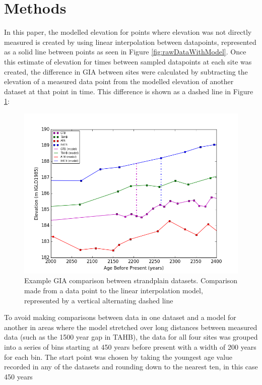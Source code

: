 \documentclass{article}
\begin{document}
 \section{Methods}
 In this paper, the modelled elevation for points where elevation was not directly
 measured is created by using linear interpolation between datapoints,
 represented as a solid line between points as seen in Figure \ref{fig:rawDataWithModel}.
 Once this estimate of elevation for times between sampled datapoints at each site
 was created, the difference in GIA between sites were calculated by subtracting
 the elevation of a measured data point from the modelled elevation of another
 dataset at that point in time. This difference is shown as a dashed line in
 Figure \ref{fig:rawDataWithModelZoomed}:
 \begin{figure}[h]
	\includegraphics[width=1.1\linewidth]{data/theDataZoomed.png}
	\caption{Example GIA comparison between strandplain datasets. Comparison made from a data point to the linear interpolation
	model, represented by a vertical alternating dashed line}
	\label{fig:rawDataWithModelZoomed}
 \end{figure}
 To avoid making comparisons between data in one dataset and a model for another
 in areas where the model stretched over long distances between measured data
 (such as the 1500 year gap in TAHB), the data for all four sites was grouped into a series of bins
 starting at 450 years before present with a width of 200 years for each bin.
 The start point was chosen by taking the youngest age value recorded in any of
 the datasets and rounding down to the nearest ten, in this case 450 years
\end{document}
